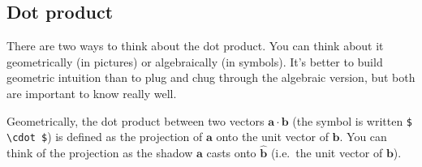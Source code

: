 \documentclass[]{article}
\theoremstyle{definition}
\begin{document}
\subsection{Dot product}

There are two ways to think about the dot product. You can think about it geometrically (in pictures) or algebraically (in symbols). It's better to build geometric intuition than to plug and chug through the algebraic version, but both are important to know really well.

Geometrically, the dot product between two vectors $\bm{a} \cdot \bm{b}$ (the symbol is written \verb|$ \cdot $|) is defined as the projection of $\bm{a}$ onto the unit vector of $\bm{b}$. You can think of the projection as the shadow $\bm{a}$ casts onto $\hat{\bm{b}}$ (i.e.\ the unit vector of $\bm{b}$).
\end{document}
